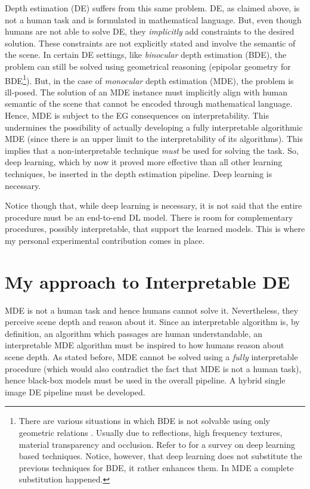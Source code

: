 Depth estimation (DE) suffers from this same problem.
DE, as claimed above, is not a human task and is formulated in mathematical language.
But, even though humans are not able to solve DE, they \textit{implicitly} add constraints to the desired solution.
These constraints are not explicitly stated and involve the semantic of the scene.
In certain DE settings, like \textit{binocular} depth estimation (BDE), the problem can still be solved using geometrical reasoning (epipolar geometry \cite{multiview} for BDE\footnote{
    There are various situations in which BDE is not solvable using only geometric relations \cite{correspondence}.
    Usually due to reflections, high frequency textures, material transparency and occlusion.
    Refer to \cite{stereo} for a survey on deep learning based techniques.
    Notice, however, that deep learning does not substitute the previous techniques for BDE, it rather enhances them.
    In MDE a complete substitution happened.
}).
But, in the case of \textit{monocular} depth estimation (MDE), the problem is ill-posed.
The solution of an MDE instance must implicitly align with human semantic of the scene that cannot be encoded through mathematical language.
Hence, MDE is subject to the EG consequences on interpretability.
This undermines the possibility of actually developing a fully interpretable algorithmic MDE (since there is an upper limit to the interpretability of its algorithms).
This implies that a non-interpretable technique \textit{must} be used for solving the task.
So, deep learning, which by now it proved more effective than all other learning techniques,  be inserted in the depth estimation pipeline.
Deep learning is necessary.

Notice though that, while deep learning is necessary, it is not said that the entire procedure must be an end-to-end DL model.
There is room for complementary procedures, possibly interpretable, that support the learned models.
This is where my personal experimental contribution comes in place.

\section{My approach to Interpretable DE}
MDE is not a human task and hence humans cannot solve it.
Nevertheless, they perceive scene depth and reason about it.
Since an interpretable algorithm is, by definition, an algorithm which passages are human understandable, an interpretable MDE algorithm must be inspired to how humans reason about scene depth.
As stated before, MDE cannot be solved using a \textit{fully} interpretable procedure (which would also contradict the fact that MDE is not a human task), hence black-box models must be used in the overall pipeline.
A hybrid single image DE pipeline must be developed.

